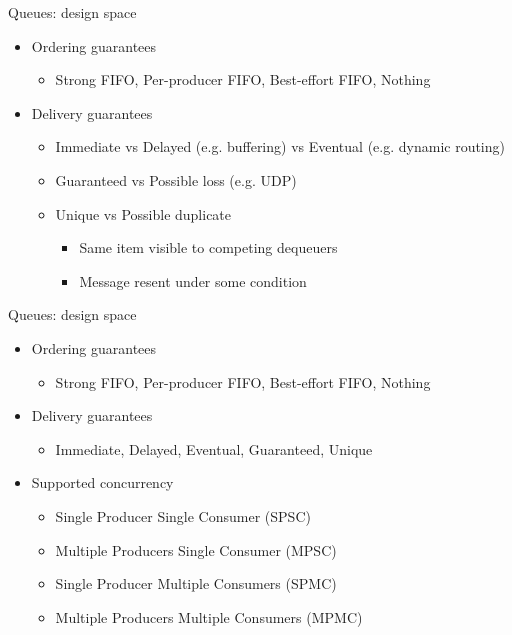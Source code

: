 \begin{frame}{Queues: design space}

\begin{itemize}
  \item Ordering guarantees
  \begin{itemize}
    \item Strong FIFO, Per-producer FIFO, Best-effort FIFO, Nothing    
  \end{itemize}
  \pause \item Delivery guarantees 
  \begin{itemize}
    \pause \item Immediate vs Delayed (e.g. buffering) vs Eventual (e.g. dynamic routing) 
    \pause \item Guaranteed vs Possible loss (e.g. UDP)
    \pause \item Unique vs Possible duplicate 
    \begin{itemize}
      \pause \item Same item visible to competing dequeuers
      \pause \item Message resent under some condition
    \end{itemize}
  \end{itemize}
\end{itemize}
\end{frame}

\begin{frame}{Queues: design space}

\begin{itemize}
  \item Ordering guarantees
  \begin{itemize}
    \item Strong FIFO, Per-producer FIFO, Best-effort FIFO, Nothing    
  \end{itemize}
  \item Delivery guarantees 
  \begin{itemize}
    \item Immediate, Delayed, Eventual, Guaranteed, Unique
  \end{itemize}
  \pause \item Supported concurrency
  \begin{itemize}
    \pause \item Single Producer Single Consumer (SPSC)
    \pause \item Multiple Producers Single Consumer (MPSC)
    \pause \item Single Producer Multiple Consumers (SPMC)
    \pause \item Multiple Producers Multiple Consumers (MPMC)    
  \end{itemize}
\end{itemize}
\end{frame}

